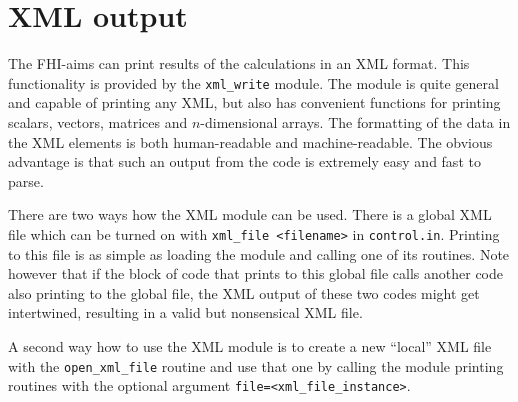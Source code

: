 \chapter{XML output}
\label{appendix_xml_output}

The FHI-aims can print results of the calculations in an XML format. This 
functionality is provided by the \verb`xml_write` module. The module is quite 
general and capable of printing any XML, but also has convenient functions for 
printing scalars, vectors, matrices and $n$-dimensional arrays. The formatting 
of the data in the XML elements is both human-readable and machine-readable. The 
obvious advantage is that such an output from the code is extremely easy and 
fast to parse.

There are two ways how the XML module can be used. There is a global XML file 
which can be turned on with \verb`xml_file <filename>` in \verb`control.in`.  
Printing to this file is as simple as loading the module and calling one of its 
routines. Note however that if the block of code that prints to this global file
calls another code also printing to the global file, the XML output of these two
codes might get intertwined, resulting in a valid but nonsensical XML file.

A second way how to use the XML module is to create a new ``local'' XML file
with the \verb`open_xml_file` routine and use that one by calling the module 
printing routines with the optional argument \verb`file=<xml_file_instance>`.
